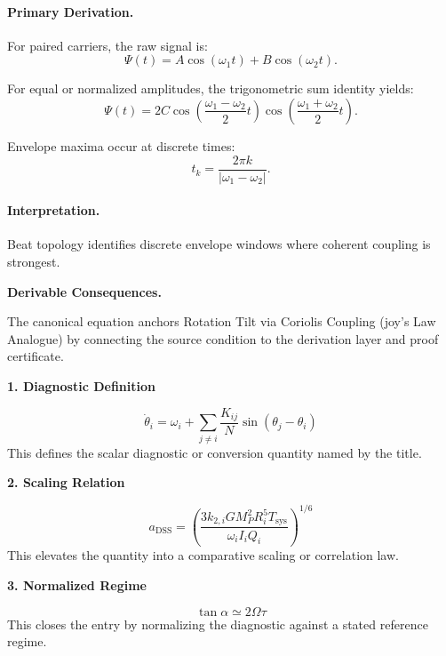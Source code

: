 \paragraph{Primary Derivation.}
For paired carriers, the raw signal is:
\begin{equation}
\Psi(t)=A\cos(\omega_1t)+B\cos(\omega_2t).
\end{equation}

For equal or normalized amplitudes, the trigonometric sum identity yields:
\begin{equation}
\Psi(t)
=
2C
\cos\left(
\frac{\omega_1-\omega_2}{2}t
\right)
\cos\left(
\frac{\omega_1+\omega_2}{2}t
\right).
\end{equation}

Envelope maxima occur at discrete times:
\begin{equation}
\boxed{
t_k=
\frac{2\pi k}{|\omega_1-\omega_2|}.
}
\end{equation}

\paragraph{Interpretation.}
Beat topology identifies discrete envelope windows where coherent coupling is strongest.

\par\vspace{0.35em}
\noindent\textbf{Derivable Consequences.}\quad
\begingroup
\footnotesize
\raggedright
The canonical equation anchors Rotation Tilt via Coriolis Coupling (joy's Law Analogue) by connecting the source condition to the derivation layer and proof certificate.
\par\endgroup

\noindent\textbf{1. Diagnostic Definition}\par
\[
\dot{\theta}_i=\omega_i+\sum_{j\ne i}\frac{K_{ij}}{N}\sin(\theta_j-\theta_i)
\]
\noindent This defines the scalar diagnostic or conversion quantity named by the title.\par
\noindent\textbf{2. Scaling Relation}\par
\[
a_{\mathrm{DSS}}=\left(\frac{3k_{2,i}GM_P^2R_i^5T_{\mathrm{sys}}}{\omega_iI_iQ_i}\right)^{1/6}
\]
\noindent This elevates the quantity into a comparative scaling or correlation law.\par
\noindent\textbf{3. Normalized Regime}\par
\[
\tan\alpha\simeq2\Omega\tau
\]
\noindent This closes the entry by normalizing the diagnostic against a stated reference regime.\par

